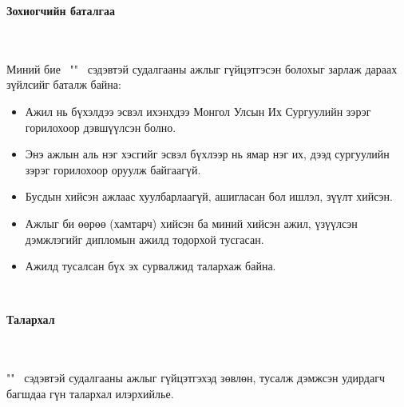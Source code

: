 \makefrontpage
\maketitle

\doublespace

\begin{huge}
\textbf{Зохиогчийн баталгаа}
\end{huge} \\ \ \\ 
\doublespace
Миний бие \@author \ "\@title" \ сэдэвтэй судалгааны ажлыг гүйцэтгэсэн болохыг зарлаж дараах зүйлсийг баталж байна:
\begin{itemize}
\item Ажил нь бүхэлдээ эсвэл ихэнхдээ Монгол Улсын Их Сургуулийн зэрэг горилохоор дэвшүүлсэн болно.
\item Энэ ажлын аль нэг хэсгийг эсвэл бүхлээр нь ямар нэг их, дээд сургуулийн зэрэг горилохоор оруулж байгаагүй.
\item Бусдын хийсэн ажлаас хуулбарлаагүй, ашигласан бол ишлэл, зүүлт хийсэн.
\item Ажлыг би өөрөө (хамтарч) хийсэн ба миний хийсэн ажил, үзүүлсэн дэмжлэгийг дипломын ажилд тодорхой тусгасан. 
\item Ажилд тусалсан бүх эх сурвалжид талархаж байна. 
\end{itemize} 
\

\newpage
\begin{huge}
\textbf{Талархал}
\end{huge} \\ \ \\ 
\doublespace
"\@title" \ сэдэвтэй судалгааны ажлыг гүйцэтгэхэд зөвлөн, тусалж дэмжсэн удирдагч багшдаа гүн талархал илэрхийлье.

\setcounter{tocdepth}{1}
\tableofcontents

\listoffigures

\listoftables

\lstlistoflistings

\newpage
\newpage

\renewcommand{\cftlabel}{Зураг}


\doublespace
{}

